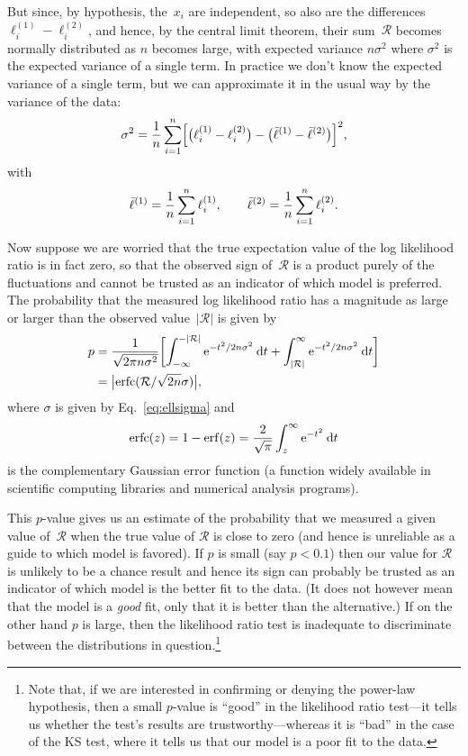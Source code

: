 \documentclass[final]{siamltex}
\newcommand{\e}{\mathrm{e}}
\renewcommand{\d}{\mathrm{d}}
\newcommand{\erf}{\mathop\mathrm{erf}}
\newcommand{\erfc}{\mathop\mathrm{erfc}}
\begin{document}
\begin{appendix}
But since, by hypothesis, the~$x_i$ are independent, so also are the
differences $\ell_i^{(1)}-\ell_i^{(2)}$, and hence, by the central limit
theorem, their sum~$\mathcal{R}$ becomes normally distributed as $n$
becomes large, with expected variance $n\sigma^2$ where $\sigma^2$ is the
expected variance of a single term.  In practice we don't know the expected
variance of a single term, but we can approximate it in the usual way by
the variance of the data:
\begin{equation}
\sigma^2 = {1\over n} \sum_{i=1}^n
          \Bigl[ \bigl( \ell_i^{(1)} - \ell_i^{(2)} \bigr)
          - \bigl( \bar{\ell}^{(1)} - \bar{\ell}^{(2)} \bigr) \Bigr]^2,
\label{eq:ellsigma}
\end{equation}
with
\begin{equation}
\bar{\ell}^{(1)} = {1\over n} \sum_{i=1}^n \ell_i^{(1)},\qquad
\bar{\ell}^{(2)} = {1\over n} \sum_{i=1}^n \ell_i^{(2)}.
\end{equation}

Now suppose we are worried that the true expectation value of the log
likelihood ratio is in fact zero, so that the observed sign of~$\mathcal{R}$ is
a product purely of the fluctuations and cannot be trusted as an indicator of
which model is preferred.  The probability that the measured log likelihood
ratio has a magnitude as large or larger than the observed
value~$|\mathcal{R}|$ is given by
\begin{align}
p &= {1\over\sqrt{2\pi n\sigma^2}} \biggl[ \int_{-\infty}^{-|\mathcal{R}|}
    \e^{-t^2/2n\sigma^2} \>\d t + \int_{|\mathcal{R}|}^\infty
    \e^{-t^2/2n\sigma^2} \>\d t \biggr] \nonumber\\
 &= \bigl| \erfc (\mathcal{R}/\sqrt{2n}\sigma) \bigr|,
\label{eq:vuong}
\end{align}
where $\sigma$ is given by Eq.~\eqref{eq:ellsigma} and
\begin{equation}
\label{eq:erfc}
\erfc(z) = 1 - \erf(z) = {2\over\sqrt{\pi}} \int_z^\infty \e^{-t^2} \>\d t
\end{equation}
is the complementary Gaussian error function (a function widely available
in scientific computing libraries and numerical analysis programs).

This $p$-value gives us an estimate of the probability that we measured a
given value of~$\mathcal{R}$ when the true value of $\mathcal{R}$ is close
to zero (and hence is unreliable as a guide to which model is favored).  If
$p$ is small (say $p<0.1$) then our value for $\mathcal{R}$ is unlikely to
be a chance result and hence its sign can probably be trusted as an
indicator of which model is the better fit to the data.  (It does not
however mean that the model is a \emph{good} fit, only that it is better
than the alternative.)  If on the other hand $p$ is large, then the
likelihood ratio test is inadequate to discriminate between the
distributions in question.\footnote{Note that, if we are interested in
 confirming or denying the power-law hypothesis, then a small $p$-value is
 ``good'' in the likelihood ratio test---it tells us whether the test's
 results are trustworthy---whereas it is ``bad'' in the case of the KS
 test, where it tells us that our model is a poor fit to the data.}


\end{appendix}
\end{document}
